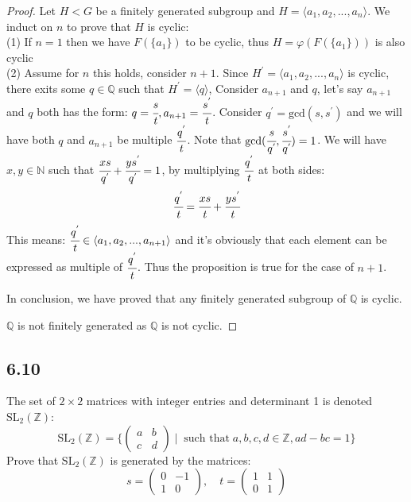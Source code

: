 \documentclass[a4paper, pdf, 12pt]{article}
\begin{document}
\begin{proof}
  Let $H<G$ be a finitely generated subgroup and $H=\langle a_1,a_2,...,a_n\rangle$. We induct on $n$ to 
  prove that $H$ is cyclic: \\
  \noindent
  (1) If $n=1$ then we have $F(\{a_1\})$ to be cyclic, thus $H=\varphi(F(\{a_1\}))$ is also cyclic\\
  (2) Assume for $n$ this holds, consider $n+1$. Since $H^{'}=\langle a_1,a_2,...,a_n\rangle$ is cyclic, there 
  exits some $q\in \mathbb{Q}$ such that $H^{'} = \langle q\rangle$, Consider $a_{n+1}$ and $q$, let's say $a_{n+1}$
  and $q$ both has the form: $q=\cfrac{s}{t}, a_{n+1}=\cfrac{s^{'}}{t}$. Consider $q^{'} = \mbox{gcd}(s, s^{'})$ and we will 
  have both $q$ and $a_{n+1}$ be multiple $\cfrac{q^{'}}{t}$. Note that $\mbox{gcd}(\cfrac{s}{q^{'}}, \cfrac{s^{'}}{q^{'}}) = 1$.
  We will have $x, y\in \mathbb{N}$ such that $\cfrac{xs}{q^{'}} + \cfrac{ys^{'}}{q^{'}} = 1$, by multiplying $\cfrac{q^{'}}{t}$ at both sides:
  $$
  \cfrac{q^{'}}{t} = \cfrac{xs}{t} + \cfrac{ys^{'}}{t}
  $$
  This means: $\cfrac{q^{'}}{t}\in \langle a_1, a_2,..., a_{n+1} \rangle$ and it's obviously that each element can be 
  expressed as multiple of $\cfrac{q^{'}}{t}$. Thus the proposition is true for the case of $n+1$. 
  
  In conclusion, we have proved that any finitely generated subgroup of $\mathbb{Q}$ is cyclic.

  $\mathbb{Q}$ is not finitely generated as $\mathbb{Q}$ is not cyclic.
\end{proof}

\subsection*{6.10}
The set of $2\times2$ matrices with integer entries and determinant 1 is denoted
$\mbox{SL}_2(\mathbb{Z})$:
$$
\mbox{SL}_2(\mathbb{Z}) = \bigg\{
  \begin{pmatrix}
    a & b \\
    c & d
  \end{pmatrix}
  \mid
  \;
  \mbox{such that}\;a, b, c, d\in \mathbb{Z},ad-bc=1
\bigg\}
$$
Prove that $\mbox{SL}_{2}(\mathbb{Z})$ is generated by the matrices:
$$
  s = \begin{pmatrix}
      0 & -1\\
      1 & 0
  \end{pmatrix}
  ,
  \quad
  t = \begin{pmatrix}
    1 & 1\\
    0 & 1
  \end{pmatrix}
$$
\end{document}
